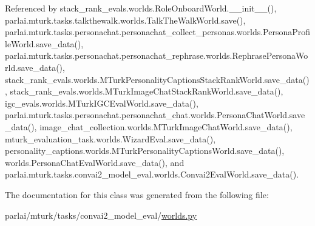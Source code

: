 Referenced by stack\+\_\+rank\+\_\+evals.\+worlds.\+Role\+Onboard\+World.\+\_\+\+\_\+init\+\_\+\+\_\+(), parlai.\+mturk.\+tasks.\+talkthewalk.\+worlds.\+Talk\+The\+Walk\+World.\+save(), parlai.\+mturk.\+tasks.\+personachat.\+personachat\+\_\+collect\+\_\+personas.\+worlds.\+Persona\+Profile\+World.\+save\+\_\+data(), parlai.\+mturk.\+tasks.\+personachat.\+personachat\+\_\+rephrase.\+worlds.\+Rephrase\+Persona\+World.\+save\+\_\+data(), stack\+\_\+rank\+\_\+evals.\+worlds.\+M\+Turk\+Personality\+Captions\+Stack\+Rank\+World.\+save\+\_\+data(), stack\+\_\+rank\+\_\+evals.\+worlds.\+M\+Turk\+Image\+Chat\+Stack\+Rank\+World.\+save\+\_\+data(), igc\+\_\+evals.\+worlds.\+M\+Turk\+I\+G\+C\+Eval\+World.\+save\+\_\+data(), parlai.\+mturk.\+tasks.\+personachat.\+personachat\+\_\+chat.\+worlds.\+Persona\+Chat\+World.\+save\+\_\+data(), image\+\_\+chat\+\_\+collection.\+worlds.\+M\+Turk\+Image\+Chat\+World.\+save\+\_\+data(), mturk\+\_\+evaluation\+\_\+task.\+worlds.\+Wizard\+Eval.\+save\+\_\+data(), personality\+\_\+captions.\+worlds.\+M\+Turk\+Personality\+Captions\+World.\+save\+\_\+data(), worlds.\+Persona\+Chat\+Eval\+World.\+save\+\_\+data(), and parlai.\+mturk.\+tasks.\+convai2\+\_\+model\+\_\+eval.\+worlds.\+Convai2\+Eval\+World.\+save\+\_\+data().



The documentation for this class was generated from the following file\+:\begin{DoxyCompactItemize}
\item 
parlai/mturk/tasks/convai2\+\_\+model\+\_\+eval/\hyperlink{parlai_2mturk_2tasks_2convai2__model__eval_2worlds_8py}{worlds.\+py}\end{DoxyCompactItemize}
